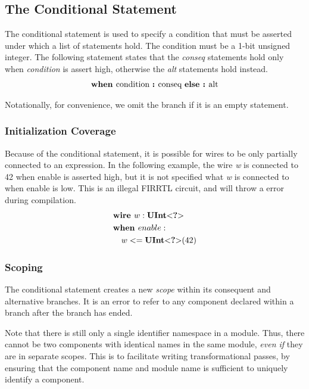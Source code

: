 \documentclass[12pt]{article}
\begin{document}
\subsection{The Conditional Statement}
The conditional statement is used to specify a condition that must be asserted under which a list of statements hold.
The condition must be a 1-bit unsigned integer.
The following statement states that the {\em conseq} statements hold only when {\em condition} is assert high, otherwise the {\em alt} statements hold instead.
\[
\begin{aligned}
\text{\bf when\ } \text{condition } \text{\bf :\ } \text{conseq } \text{\bf else :\ } \text{alt}
\end{aligned}
\]

Notationally, for convenience, we omit the  branch if it is an empty statement. 

\subsubsection{Initialization Coverage}
Because of the conditional statement, it is possible for wires to be only partially connected to an expression.
In the following example, the wire {\em w} is connected to 42 when enable is asserted high, but it is not specified what {\em w} is connected to when enable is low.
This is an illegal FIRRTL circuit, and will throw a  error during compilation.
\[
\begin{aligned}
&\text{\bf wire\ } w : \text{\bf UInt}\text{\bf $<$} \text{\bf ?} \text{\bf $>$} \\
&\text{\bf when\ } enable : \\
&\quad w <= \text{\bf UInt}\text{\bf $<$} \text{\bf ?} \text{\bf $>$}(42) \\
\end{aligned}
\]

\subsubsection{Scoping}
The conditional statement creates a new {\em scope} within its consequent and alternative branches.
It is an error to refer to any component declared within a branch after the branch has ended.

Note that there is still only a single identifier namespace in a module.
Thus, there cannot be two components with identical names in the same module, {\em even if} they are in separate scopes.
This is to facilitate writing transformational passes, by ensuring that the component name and module name is sufficient to uniquely identify a component.
\end{document}
